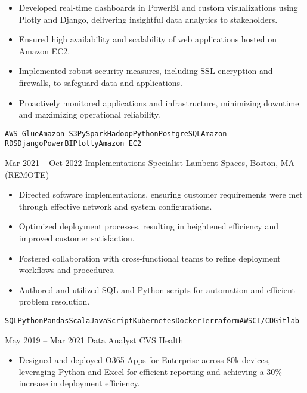 \documentclass[9pt]{developercv} %
\begin{document}
\begin{entrylist}
{\begin{itemize}
            \item Developed real-time dashboards in PowerBI and custom visualizations using Plotly and Django, delivering insightful data analytics to stakeholders.
            \item Ensured high availability and scalability of web applications hosted on Amazon EC2.
            \item Implemented robust security measures, including SSL encryption and firewalls, to safeguard data and applications.
            \item Proactively monitored applications and infrastructure, minimizing downtime and maximizing operational reliability.
        \end{itemize}
        \texttt{AWS Glue}\slashsep\texttt{Amazon S3}\slashsep\texttt{PySpark}\slashsep\texttt{Hadoop}\slashsep\texttt{Python}\slashsep\texttt{PostgreSQL}\slashsep\texttt{Amazon RDS}\slashsep\texttt{Django}\slashsep\texttt{PowerBI}\slashsep\texttt{Plotly}\slashsep\texttt{Amazon EC2}
        }
    \entry
        { Mar 2021 -- Oct 2022 }
        { Implementations Specialist}
        {Lambent Spaces, Boston, MA (REMOTE)}
        {
        \begin{itemize}
            \item Directed software implementations, ensuring customer requirements were met through effective network and system configurations.
            \item Optimized deployment processes, resulting in heightened efficiency and improved customer satisfaction.
            \item Fostered collaboration with cross-functional teams to refine deployment workflows and procedures.
            \item Authored and utilized SQL and Python scripts for automation and efficient problem resolution.
        \end{itemize}
        \texttt{SQL}\slashsep\texttt{Python}\slashsep\texttt{Pandas}\slashsep\texttt{Scala}\slashsep\texttt{JavaScript}\slashsep\texttt{Kubernetes}\slashsep\texttt{Docker}\slashsep\texttt{Terraform}\slashsep\texttt{AWS}\slashsep\texttt{CI/CD}\slashsep\texttt{Gitlab}
        }
    \entry
        {May 2019 -- Mar 2021}
        { Data Analyst}
        {CVS Health}
        {
        \begin{itemize}
            \item Designed and deployed O365 Apps for Enterprise across 80k devices, leveraging Python and Excel for efficient reporting and achieving a 30\% increase in deployment efficiency.

\end{itemize}}
\end{entrylist}
\end{document}
